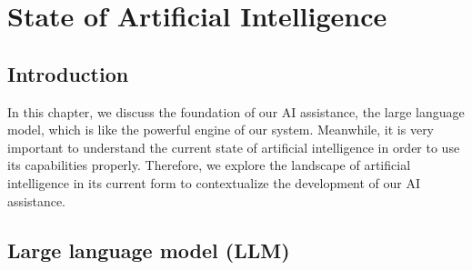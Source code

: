 \chapter{State of Artificial Intelligence }

\section{Introduction}
In this chapter, we discuss the foundation of our AI assistance, the large language model, which is like the powerful engine of our system. Meanwhile, it is very important to understand the current state of artificial intelligence in order to use its capabilities properly. Therefore, we explore the landscape of artificial intelligence in its current form to contextualize the development of our AI assistance. 
\section{Large language model (LLM)}
